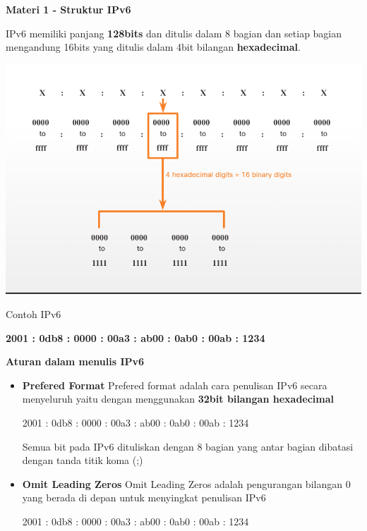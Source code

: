 \documentclass{article}
\begin{document}
    \begin{flushleft}
        \textbf{Materi 1 - Struktur IPv6}
        \newline

        IPv6 memiliki panjang \textbf{128bits} dan ditulis dalam 8 bagian dan setiap bagian mengandung 16bits yang ditulis dalam 4bit bilangan \textbf{hexadecimal}.

        \begin{center}
            \includegraphics[scale=0.5]{1-1.png}
        \end{center}
        
        Contoh IPv6 
        \begin{center}
            \textbf{2001 : 0db8 : 0000 : 00a3 : ab00 : 0ab0 : 00ab : 1234}
            \newline
        \end{center}

        \textbf{Aturan dalam menulis IPv6}
        \begin{itemize}
            \item[] \textbf{Prefered Format} \newline
            Prefered format adalah cara penulisan IPv6 secara menyeluruh yaitu dengan menggunakan \textbf{32bit bilangan hexadecimal}
            \begin{center}
                2001 : 0db8 : 0000 : 00a3 : ab00 : 0ab0 : 00ab : 1234
            \end{center}
            Semua bit pada IPv6 dituliskan dengan 8 bagian yang antar bagian dibatasi dengan tanda titik koma (;)

            \item[] \textbf{Omit Leading Zeros} \newline
            Omit Leading Zeros adalah pengurangan bilangan 0 yang berada di depan untuk menyingkat penulisan IPv6
            \begin{center}
                2001 : 0db8 : 0000 : 00a3 : ab00 : 0ab0 : 00ab : 1234
            \end{center}
            

\end{itemize}
\end{flushleft}
\end{document}
